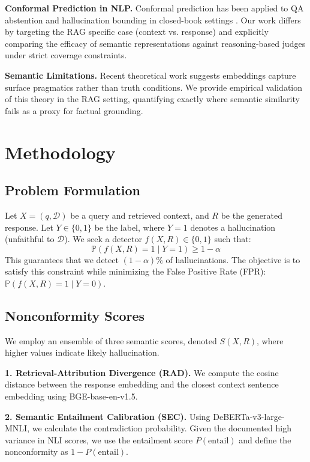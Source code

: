 \documentclass[11pt]{article}
\begin{document}
\textbf{Conformal Prediction in NLP.} Conformal prediction has been applied to QA abstention \cite{kamath2020selective} and hallucination bounding in closed-book settings \cite{yadkori2024conformal}. Our work differs by targeting the RAG specific case (context vs. response) and explicitly comparing the efficacy of semantic representations against reasoning-based judges under strict coverage constraints.

\textbf{Semantic Limitations.} Recent theoretical work \cite{li2025implicitsemantics} suggests embeddings capture surface pragmatics rather than truth conditions. We provide empirical validation of this theory in the RAG setting, quantifying exactly where semantic similarity fails as a proxy for factual grounding.

\section{Methodology}

\subsection{Problem Formulation}

Let $X = (q, \mathcal{D})$ be a query and retrieved context, and $R$ be the generated response. Let $Y \in \{0, 1\}$ be the label, where $Y=1$ denotes a hallucination (unfaithful to $\mathcal{D}$). We seek a detector $f(X, R) \in \{0, 1\}$ such that:
\begin{equation}
    \mathbb{P}(f(X, R) = 1 \mid Y = 1) \geq 1 - \alpha
\end{equation}
This guarantees that we detect $(1-\alpha)\%$ of hallucinations. The objective is to satisfy this constraint while minimizing the False Positive Rate (FPR): $\mathbb{P}(f(X, R)=1 \mid Y=0)$.

\subsection{Nonconformity Scores}

We employ an ensemble of three semantic scores, denoted $S(X, R)$, where higher values indicate likely hallucination.

\textbf{1. Retrieval-Attribution Divergence (RAD).} We compute the cosine distance between the response embedding and the closest context sentence embedding using BGE-base-en-v1.5.

\textbf{2. Semantic Entailment Calibration (SEC).} Using DeBERTa-v3-large-MNLI, we calculate the contradiction probability. Given the documented high variance in NLI scores, we use the entailment score $P(\text{entail})$ and define the nonconformity as $1 - P(\text{entail})$.
\end{document}
